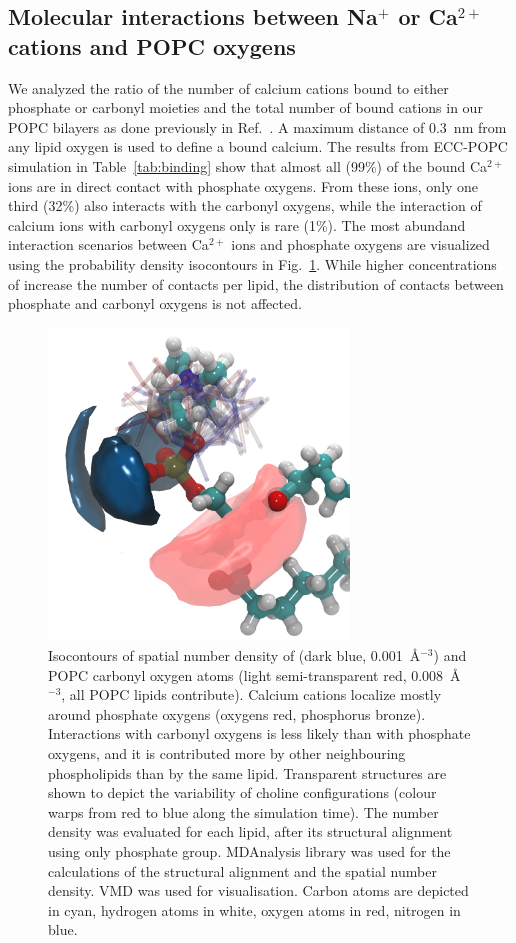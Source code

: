 \subsection{Molecular interactions between Na$^+$ or Ca$^{2+}$ cations and POPC oxygens} 
We analyzed the ratio of the number of calcium cations bound to either phosphate or carbonyl moieties and the total number of bound cations in our POPC bilayers as done previously in Ref.~\citep{javanainen17}. A maximum distance of 0.3~nm from any lipid oxygen is used to define a bound calcium. The results from ECC-POPC simulation in Table~\ref{tab:binding} show that almost all (99\%) of the bound Ca$^{2+}$ ions are in direct contact with phosphate oxygens. From these ions, only one third (32\%) also interacts with the carbonyl oxygens, while the interaction of calcium ions with carbonyl oxygens only is rare (1\%). The most abundand interaction scenarios between Ca$^{2+}$ ions and phosphate oxygens are visualized using the probability density isocontours in Fig.~\ref{fig:volmaps}. While higher concentrations of  increase the number of contacts per lipid, the distribution of contacts between phosphate and carbonyl oxygens is not affected. 
 
\begin{figure}[tb!] 
  \centering 
  \includegraphics[width=8.0cm]{../img/ecc_popc/isocontours_r37_ca_O-carb.png} 
  \caption{\label{fig:volmaps} 
    Isocontours of spatial number density of  (dark blue, 0.001~Å$^{-3}$) 
    and POPC carbonyl oxygen atoms (light semi-transparent red, 0.008~Å$^{-3}$, all POPC lipids contribute). 
    Calcium cations localize mostly around phosphate oxygens (oxygens red, phosphorus bronze).
    Interactions with carbonyl oxygens is less likely than with phosphate oxygens, 
    and it is contributed more by other neighbouring phospholipids than by the same lipid. 
    Transparent structures are shown to depict the variability of choline configurations 
    (colour warps from red to blue along the simulation time). 
    The number density was evaluated for each lipid, 
    after its structural alignment using only phosphate group.
    MDAnalysis \citep{mdanalysis2011} library was used for 
    the calculations of the structural alignment and the spatial number density. 
    VMD \citep{hump96} was used for visualisation. 
    Carbon atoms are depicted in cyan, hydrogen atoms in white, oxygen atoms in red, nitrogen in blue.
  } 
\end{figure} 
 
